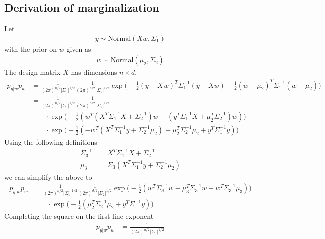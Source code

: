 \documentclass{article}
\newcommand{\Normaldist}{\text{Normal}}
\begin{document}
\begin{appendices}
  \section{Derivation of marginalization}
  \label{appendix:marginalization}

Let
\begin{align}
  y \sim \Normaldist(Xw,\Sigma_1)
\end{align}
with the prior on $w$ given as
\begin{align}
  w \sim \Normaldist(\mu_2, \Sigma_2)
\end{align}
The design matrix $X$ has dimensions $n \times d$.
\begin{align}
  p_{y|w}p_w & =
    \frac{1}{(2 \pi)^{n/2} |\Sigma_1|^{1/2}}
    \frac{1}{(2 \pi)^{d/2} |\Sigma_2|^{1/2}}
    \exp{ \Big(
      -\frac{1}{2}(y - Xw)^T \Sigma_1^{-1} (y-Xw)
      -\frac{1}{2}(w - \mu_2)^T \Sigma_1^{-1} (w-\mu_2) \Big)} \\
    & = \frac{1}{(2 \pi)^{n/2} |\Sigma_1|^{1/2}}
    \frac{1}{(2 \pi)^{d/2} |\Sigma_2|^{1/2}} \\
    & \quad \quad \cdot \exp{\big(
      -\frac{1}{2}(w^T(X^T \Sigma_1^{-1} X + \Sigma_2^{-1})w
      -(y^T \Sigma_1^{-1} X + \mu_2^T \Sigma_2^{-1})w )
    \big)} \\
    & \quad \quad \cdot \exp{\big(
        -\frac{1}{2}(
          - w^T(X^T \Sigma_1^{-1}y + \Sigma_2^{-1} \mu_2)
          + \mu_2^T \Sigma_2^{-1} \mu_2 + y^T \Sigma_1^{-1}y
        )
    \big)}
\end{align}
Using the following definitions
\begin{align}
  \Sigma_3^{-1} & = X^T \Sigma_1^{-1} X + \Sigma_2^{-1} \\
  \mu_3 & = \Sigma_3 (X^T \Sigma_1^{-1}y + \Sigma_2^{-1} \mu_2)
\end{align}
we can simplify the above to
\begin{align}
    p_{y|w}p_w & =
    \frac{1}{(2 \pi)^{n/2} |\Sigma_1|^{1/2}}
    \frac{1}{(2 \pi)^{d/2} |\Sigma_2|^{1/2}}
    \exp{\big(
      -\frac{1}{2} (w^T \Sigma_3^{-1} w - \mu_3^T \Sigma_3^{-1} w - w^T \Sigma_3^{-1} \mu_3)
    \big)} \\
    & \quad \quad \cdot \exp{\big(
      -\frac{1}{2} (\mu_2^T \Sigma_2^{-1} \mu_2 + y^T \Sigma^{-1} y)
    \big)}
\end{align}
Completing the square on the first line exponent
\begin{align}
  p_{y|w}p_w & =
    \frac{1}{(2 \pi)^{n/2} |\Sigma_1|^{1/2}}

\end{align}
\end{appendices}
\end{document}
